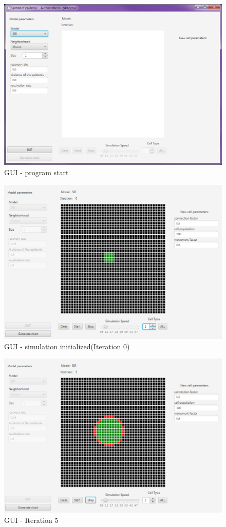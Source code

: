 \documentclass[a4paper, 11pt]{article}
\begin{document}
\begin{figure}[H]
\includegraphics[width=\textwidth]{guiinit.PNG} 
\caption{GUI - program start}
\end{figure}
\iffalse
\begin{figure}[H]
\includegraphics[width=\textwidth]{i0.PNG} 
\caption{GUI - simulation initialized(Iteration 0) }
\end{figure}
\begin{figure}[H]
\includegraphics[width=\textwidth]{i5.PNG} 
\caption{GUI - Iteration 5}
\end{figure}
\end{document}
